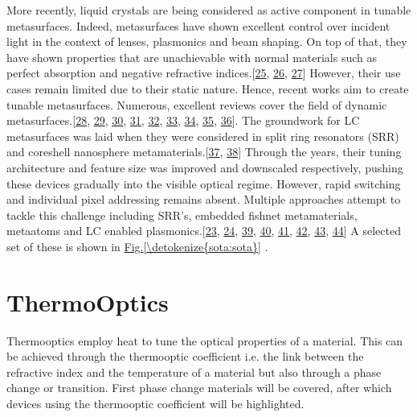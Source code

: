 \documentclass[a4paper,10pt,english,openany,oneside]{jupyterBook}
\begin{document}
\sphinxAtStartPar
More recently, liquid crystals are being considered as active component in tunable metasurfaces. Indeed, metasurfaces have shown excellent control over incident light in the context of lenses, plasmonics and beam shaping. On top of that, they have shown properties that are unachievable with normal materials such as perfect absorption and negative refractive indices.{[}\hyperlink{cite.bib:id308}{25}, \hyperlink{cite.bib:id178}{26}, \hyperlink{cite.bib:id49}{27}{]} However, their use cases remain limited due to their static nature. Hence, recent works aim to create tunable metasurfaces. Numerous, excellent reviews cover the field of dynamic metasurfaces.{[}\hyperlink{cite.bib:id136}{28}, \hyperlink{cite.bib:id268}{29}, \hyperlink{cite.bib:id449}{30}, \hyperlink{cite.bib:id451}{31}, \hyperlink{cite.bib:id396}{32}, \hyperlink{cite.bib:id454}{33}, \hyperlink{cite.bib:id30}{34}, \hyperlink{cite.bib:id56}{35}, \hyperlink{cite.bib:id386}{36}{]}. The groundwork for LC metasurfaces was laid when they were considered in split ring resonators (SRR) and core\sphinxhyphen{}shell nanosphere metamaterials.{[}\hyperlink{cite.bib:id305}{37}, \hyperlink{cite.bib:id159}{38}{]} Through the years, their tuning architecture and feature size was improved and downscaled respectively, pushing these devices gradually into the visible optical regime. However, rapid switching and individual pixel addressing remains absent. Multiple approaches attempt to tackle this challenge including SRR’s, embedded fishnet metamaterials, meta\sphinxhyphen{}atoms and LC enabled plasmonics.{[}\hyperlink{cite.bib:id165}{23}, \hyperlink{cite.bib:id143}{24}, \hyperlink{cite.bib:id23}{39}, \hyperlink{cite.bib:id83}{40}, \hyperlink{cite.bib:id157}{41}, \hyperlink{cite.bib:id112}{42}, \hyperlink{cite.bib:id450}{43}, \hyperlink{cite.bib:id121}{44}{]} A selected set of these is shown in \hyperref[\detokenize{sota:sota}]{Fig.\@ \ref{\detokenize{sota:sota}}} .


\section{Thermo\sphinxhyphen{}Optics}
\label{\detokenize{sota:thermo-optics}}
\sphinxAtStartPar
Thermo\sphinxhyphen{}optics employ heat to tune the optical properties of a material. This can be achieved through the thermo\sphinxhyphen{}optic coefficient i.e. the link between the refractive index and the temperature of a material but also through a phase change or transition. First phase change materials will be covered, after which devices using the thermo\sphinxhyphen{}optic coefficient will be highlighted.
\end{document}
